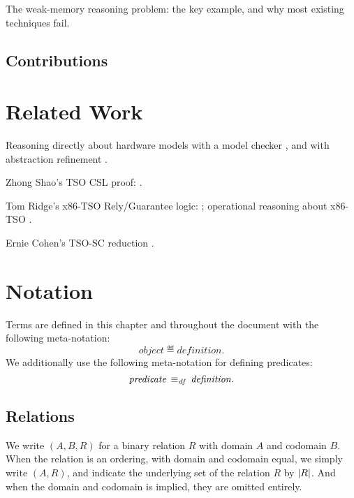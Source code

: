 \documentclass[11pt]{report}
\begin{document}
The weak-memory reasoning problem: the key example, and why most existing techniques fail. 



\section{Contributions} %
\label{sec:contributions}




\chapter{Related Work} %
\label{cha:related_work}

Reasoning directly about hardware models with a model checker \cite{DPN93}, and with abstraction refinement \cite{ChatterjeeDissertation}. 

Zhong Shao's TSO CSL proof: \cite{DBLP:conf/esop/FerreiraFS10}.

Tom Ridge's x86-TSO Rely/Guarantee logic: \cite{DBLP:conf/vstte/Ridge10}; operational reasoning about x86-TSO \cite{DBLP:conf/tphol/Ridge07}.

Ernie Cohen's TSO-SC reduction \cite{DBLP:conf/itp/CohenS10}. 


\chapter{Notation} %
\label{ch:notation}

Terms are defined in this chapter and throughout the document with the following meta-notation: \[ \mathit{object} \eqdef \mathit{definition}.\] We additionally use the following meta-notation for defining predicates: \[ \mathit{predicate} \operatorname{\;\equiv_{\mathit{df}}\;} \mathit{definition}.\]

\section{Relations} %
\label{sec:relations}

We write $(A,B,R)$ for a binary relation $R$ with domain $A$ and codomain $B$. When the relation is an ordering, with domain and codomain equal, we simply write $(A,R)$, and indicate the underlying set of the relation $R$ by $|R|$. And when the domain and codomain is implied, they are omitted entirely. 
\end{document}
